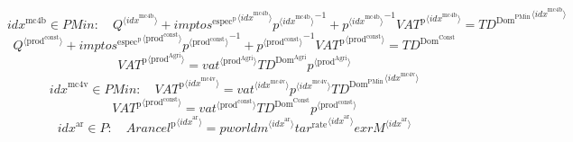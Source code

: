 \begin{equation}
{i\!d\!x}^{\mathrm{mc4b}}\in {P\!M\!i\!n}\colon\quad {Q}^{\langle {i\!d\!x}^{\mathrm{mc4b}}\rangle} + {{{i\!m\!p\!t\!o\!s}^{\mathrm{espec}^{\mathrm{p}}}}^{\langle {i\!d\!x}^{\mathrm{mc4b}}\rangle}} {{p}^{\langle {i\!d\!x}^{\mathrm{mc4b}}\rangle}}^{-1} + {{p}^{\langle {i\!d\!x}^{\mathrm{mc4b}}\rangle}}^{-1} {{{V\!A\!T}^{\mathrm{p}}}^{\langle {i\!d\!x}^{\mathrm{mc4b}}\rangle}} = {{T\!D}^{\mathrm{Dom}^{\mathrm{PMin}}}}^{\langle {i\!d\!x}^{\mathrm{mc4b}}\rangle}
\end{equation}
\begin{equation}
{Q}^{\langle \mathrm{prod}^{\mathrm{const}}\rangle} + {{{i\!m\!p\!t\!o\!s}^{\mathrm{espec}^{\mathrm{p}}}}^{\langle \mathrm{\mathrm{prod}^{\mathrm{const}}}\rangle}} {{p}^{\langle \mathrm{prod}^{\mathrm{const}}\rangle}}^{-1} + {{p}^{\langle \mathrm{prod}^{\mathrm{const}}\rangle}}^{-1} {{{V\!A\!T}^{\mathrm{p}}}^{\langle \mathrm{prod}^{\mathrm{const}}\rangle}} = {T\!D}^{\mathrm{Dom}^{\mathrm{Const}}}
\end{equation}
\begin{equation}
{{V\!A\!T}^{\mathrm{p}}}^{\langle \mathrm{prod}^{\mathrm{Agri}}\rangle} = {{{v\!a\!t}}^{\langle \mathrm{\mathrm{prod}^{\mathrm{Agri}}}\rangle}} {{T\!D}^{\mathrm{Dom}^{\mathrm{Agri}}}} {{p}^{\langle \mathrm{prod}^{\mathrm{Agri}}\rangle}}
\end{equation}
\begin{equation}
{i\!d\!x}^{\mathrm{mc4v}}\in {P\!M\!i\!n}\colon\quad {{V\!A\!T}^{\mathrm{p}}}^{\langle {i\!d\!x}^{\mathrm{mc4v}}\rangle} = {{{v\!a\!t}}^{\langle {i\!d\!x}^{\mathrm{mc4v}}\rangle}} {{p}^{\langle {i\!d\!x}^{\mathrm{mc4v}}\rangle}} {{{T\!D}^{\mathrm{Dom}^{\mathrm{PMin}}}}^{\langle {i\!d\!x}^{\mathrm{mc4v}}\rangle}}
\end{equation}
\begin{equation}
{{V\!A\!T}^{\mathrm{p}}}^{\langle \mathrm{prod}^{\mathrm{const}}\rangle} = {{{v\!a\!t}}^{\langle \mathrm{\mathrm{prod}^{\mathrm{const}}}\rangle}} {{T\!D}^{\mathrm{Dom}^{\mathrm{Const}}}} {{p}^{\langle \mathrm{prod}^{\mathrm{const}}\rangle}}
\end{equation}
\begin{equation}
{i\!d\!x}^{\mathrm{ar}}\in P\colon\quad {{A\!r\!a\!n\!c\!e\!l}^{\mathrm{p}}}^{\langle {i\!d\!x}^{\mathrm{ar}}\rangle} = {{{p\!w\!o\!r\!l\!d\!m}}^{\langle {i\!d\!x}^{\mathrm{ar}}\rangle}} {{{t\!a\!r}^{\mathrm{rate}}}^{\langle {i\!d\!x}^{\mathrm{ar}}\rangle}} {{e\!x\!r}} {{M}^{\langle {i\!d\!x}^{\mathrm{ar}}\rangle}}
\end{equation}




